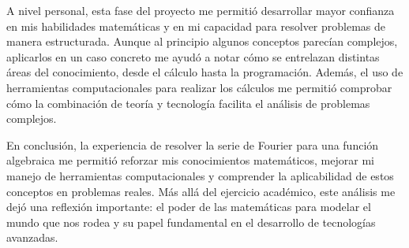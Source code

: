 {A nivel personal, esta fase del proyecto me permitió desarrollar mayor confianza en mis habilidades matemáticas y en mi capacidad para resolver problemas de manera estructurada. Aunque al principio algunos conceptos parecían complejos, aplicarlos en un caso concreto me ayudó a notar cómo se entrelazan distintas áreas del conocimiento, desde el cálculo hasta la programación. Además, el uso de herramientas computacionales para realizar los cálculos me permitió comprobar cómo la combinación de teoría y tecnología facilita el análisis de problemas complejos.

En conclusión, la experiencia de resolver la serie de Fourier para una función algebraica me permitió reforzar mis conocimientos matemáticos, mejorar mi manejo de herramientas computacionales y comprender la aplicabilidad de estos conceptos en problemas reales. Más allá del ejercicio académico, este análisis me dejó una reflexión importante: el poder de las matemáticas para modelar el mundo que nos rodea y su papel fundamental en el desarrollo de tecnologías avanzadas.


}